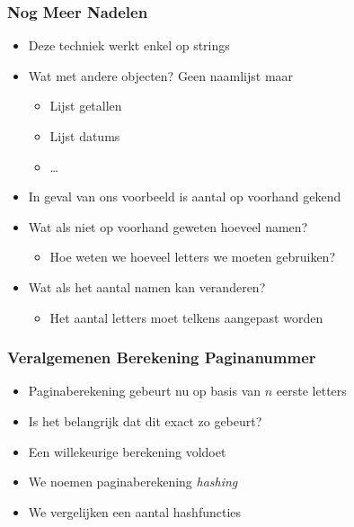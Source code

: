 \documentclass[dutch]{ucll-slides}
\begin{document}
\begin{frame}
  \frametitle{Nog Meer Nadelen}
  \begin{itemize}
    \item Deze techniek werkt enkel op strings
    \item Wat met andere objecten? Geen naamlijst maar
          \begin{itemize}
            \item Lijst getallen
            \item Lijst datums
            \item \dots
          \end{itemize}
  \end{itemize}
  \vskip5mm
  \begin{itemize}
    \item In geval van ons voorbeeld is aantal op voorhand gekend
    \item Wat als niet op voorhand geweten hoeveel namen?
          \begin{itemize}
            \item Hoe weten we hoeveel letters we moeten gebruiken?
          \end{itemize}
    \item Wat als het aantal namen kan veranderen?
          \begin{itemize}
            \item Het aantal letters moet telkens aangepast worden
          \end{itemize}
  \end{itemize}
\end{frame}

\begin{frame}
  \frametitle{Veralgemenen Berekening Paginanummer}
  \begin{itemize}
    \item Paginaberekening gebeurt nu op basis van $n$ eerste letters
    \item Is het belangrijk dat dit exact zo gebeurt?
    \item Een willekeurige berekening voldoet
    \item We noemen paginaberekening \emph{hashing}
    \item We vergelijken een aantal hashfuncties
  \end{itemize}
\end{frame}
\end{document}
